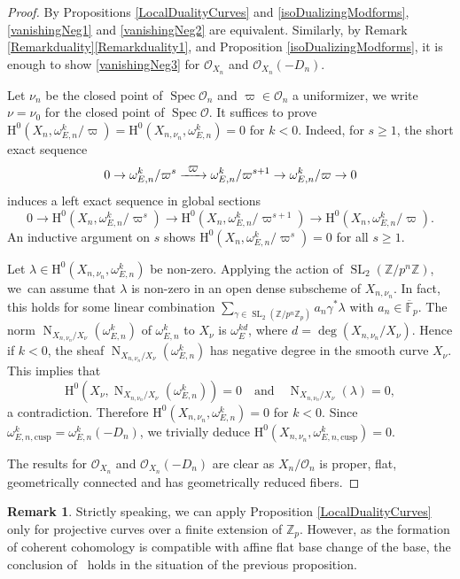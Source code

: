\documentclass[JEP,XML,SOM,Unicode,published]{cedram}
\newcommand{\quand}{\quad\text{and}\quad}
\newcommand\To[1]{\mathchoice{\xrightarrow{\textstyle\kern4pt#1\kern3pt}}{\stackrel{#1}{\to}}{}{}}
\newcommand{\cusp}{\mathrm{cusp}}
\numberwithin{equation}{section}
\theoremstyle{definition}
\newtheorem{remark}[prop]{Remark}
\newcommand{\bb}[1]{\mathbb{#1}}
\newcommand{\n}[1]{\mathcal{#1}}
\newcommand{\s}[1]{\mathscr{#1}}
\DeclareMathOperator{\SL}{SL}
\DeclareMathOperator{\N}{N}
\DeclareMathOperator{\Spec}{Spec}
\begin{document}
\begin{proof}
By Propositions \ref{LocalDualityCurves} and \ref{isoDualizingModforms}, \eqref{vanishingNeg1} and \eqref{vanishingNeg2} are equivalent. Similarly, by \hbox{Remark} \ref{Remarkduality}\eqref{Remarkduality1}, and Proposition \ref{isoDualizingModforms}, it is enough to show \eqref{vanishingNeg3} for $\s{O}_{X_n}$ and $\s{O}_{X_n}(-D_n)$.

Let $\nu_n$ be the closed point of $\Spec \n{O}_n$ and $\varpi\in \n{O}_n$ a uniformizer, we write $\nu=\nu_0$ for the closed point of $\Spec \n{O}$. It suffices to prove $\mathrm{H}^0(X_{n}, \omega^k_{E,n}/\varpi)=\mathrm{H}^0(X_{n,\nu_n}, \omega^k_{E,n})=0$ for $k<0$. Indeed, for $s\geq 1$, the short exact sequence
\[0\to \omega^k_{E,n}/ \varpi^{s}\To{\varpi} \omega^k_{E,n}/\varpi^{s+1}\to \omega^{k}_{E,n}/\varpi \to 0\]
induces a left exact sequence in global sections
\[
0\to \mathrm{H}^0(X_n, \omega^k_{E,n}/ \varpi^s)\to \mathrm{H}^0(X_n, \omega^k_{E,n}/\varpi^{s+1})\to \mathrm{H}^0(X_n, \omega^k_{E,n}/\varpi).
\]
An inductive argument on $s$ shows $\mathrm{H}^0(X_n, \omega^k_{E,n}/\varpi^s)=0$ for all $s\geq 1$.

Let $\lambda\in \mathrm{H}^0(X_{n,\nu_n}, \omega^k_{E,n})$ be non-zero. Applying the action of $\SL_2(\bb{Z}/p^n\bb{Z})$, we~can assume that $\lambda$ is non-zero in an open dense subscheme of $X_{n,\nu_n}$. In fact, this holds for some linear combination $\sum_{\gamma\in \SL_2(\bb{Z}/p^n\bb{Z}_p)} a_n \gamma^* \lambda$ with $a_n\in \overline{\bb{F}}_p$. The norm $\N_{X_{n,\nu_n}/X_{\nu}}(\omega^k_{E,n})$ of $\omega^k_{E,n}$ to $X_\nu$ is $\omega^{kd}_{E}$, where $d=\deg(X_{n,\nu_n}/X_\nu)$. Hence if $k<0$, the sheaf $\N_{X_{n,\nu_n}/X_\nu}(\omega^k_{E,n})$ has negative degree in the smooth curve $X_{\nu}$. This implies that
\[
\mathrm{H}^0(X_{\nu}, \N_{X_{n,\nu_n}/X_\nu}(\omega^k_{E,n}))=0\quand\N_{X_{n,\nu_n}/X_{\nu}}(\lambda)=0,
\]
a contradiction. Therefore $\mathrm{H}^0(X_{n,\nu_n}, \omega^k_{E,n})\!=\!0$ for $k\!<\!0$. Since $\omega^k_{E,n,\cusp}\!=\!\omega_{E,n}^k(-D_n)$, we trivially deduce $\mathrm{H}^0(X_{n,\nu_n},\omega^k_{E,n,\cusp})=0$.

The results for $\s{O}_{X_n}$ and $\s{O}_{X_n}(-D_n)$ are clear as $X_n/\n{O}_{n}$ is proper, flat, geometrically connected and has geometrically reduced fibers.
\end{proof}

\begin{remark}
\label{remark1}
Strictly speaking, we can apply Proposition \ref{LocalDualityCurves} only for projective curves over a finite extension of $\bb{Z}_p$. However, as the formation of coherent cohomology is compatible with affine flat base change of the base, the conclusion of \loccit\ holds in the situation of the previous proposition.
\end{remark}
\end{document}
